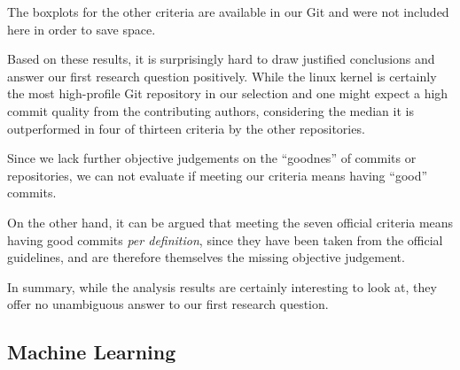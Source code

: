 The boxplots for the other criteria are available in our Git and were not included here in order to save space.

Based on these results, it is surprisingly hard to draw justified conclusions and answer our first research question positively. While the linux kernel is certainly the most high-profile Git repository in our selection and one might expect a high commit quality from the contributing authors, considering the median it is outperformed in four of thirteen criteria by the other repositories.

Since we lack further objective judgements on the ``goodnes'' of commits or repositories, we can not evaluate if meeting our criteria means having ``good'' commits.

On the other hand, it can be argued that meeting the seven official criteria means having good commits \emph{per definition}, since they have been taken from the official guidelines, and are therefore themselves the missing objective judgement.

In summary, while the analysis results are certainly interesting to look at, they offer no unambiguous answer to our first research question.

\subsection{Machine Learning}
\label{sec:results2}


%
%

